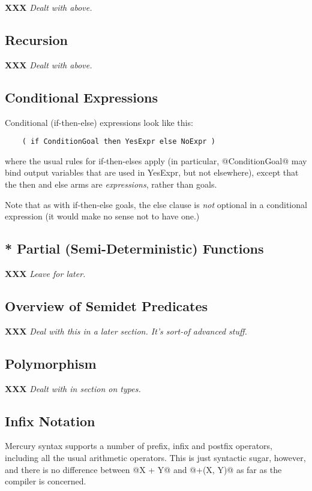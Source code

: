 \documentclass[a4paper,11pt,notitlepage,onecolumn]{article}
\newcommand{\XXX}[1]%
{{\small\textbf{XXX} \emph{#1}}}
\begin{document}
\XXX{Dealt with above.}

\subsection{Recursion}

\XXX{Dealt with above.}

\subsection{Conditional Expressions}

Conditional (if-then-else) expressions look like this:
\begin{verbatim}
    ( if ConditionGoal then YesExpr else NoExpr )
\end{verbatim}
where the usual rules for if-then-elses apply (in particular,
@ConditionGoal@ may bind output variables that are used in
YesExpr, but not elsewhere), except that the then and else
arms are \emph{expressions}, rather than goals.

Note that as with if-then-else goals, the else clause is \emph{not}
optional in a conditional expression (it would make no sense
not to have one.)

\subsection{* Partial (Semi-Deterministic) Functions}

\XXX{Leave for later.}

\subsection{Overview of Semidet Predicates}

\XXX{Deal with this in a later section.  It's sort-of advanced
stuff.}

\subsection{Polymorphism}

\XXX{Dealt with in section on types.}

\subsection{Infix Notation}

Mercury syntax supports a number of prefix, infix and postfix
operators, including all the usual arithmetic operators.  This
is just syntactic sugar, however, and there is no difference
between @X + Y@ and @+(X, Y)@ as far as the compiler is concerned.
\end{document}
